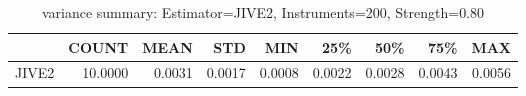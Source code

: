 \begin{table}[ht]
\centering
\caption{variance summary: Estimator=JIVE2, Instruments=200, Strength=0.80}
\begin{tabular}{lrrrrrrrr}
\toprule
 & COUNT & MEAN & STD & MIN & 25\% & 50\% & 75\% & MAX \\
\midrule
JIVE2 & 10.0000 & 0.0031 & 0.0017 & 0.0008 & 0.0022 & 0.0028 & 0.0043 & 0.0056 \\
\bottomrule
\end{tabular}
\end{table}
